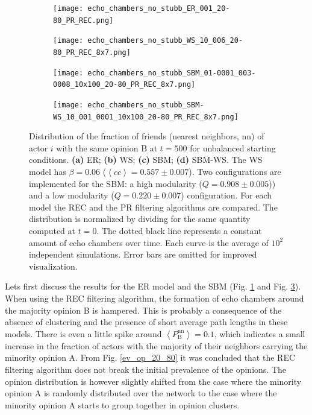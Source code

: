 \documentclass[11 pt , letterpaper , twoside , openright]{book}
\begin{document}
\begin{figure}[H]
  \begin{subfigure}[b]{0.49\textwidth}
    \caption{}
  	\texttt{[image: echo\_chambers\_no\_stubb\_ER\_001\_20-80\_PR\_REC.png]}
    \label{er_echo_20-80}
  \end{subfigure}
  \begin{subfigure}[b]{0.49\textwidth}
    \caption{}
  	\texttt{[image: echo\_chambers\_no\_stubb\_WS\_10\_006\_20-80\_PR\_REC\_8x7.png]}
    \label{ws}
  \end{subfigure}
  \begin{subfigure}[b]{0.49\textwidth}
    \caption{}
    \texttt{[image: echo\_chambers\_no\_stubb\_SBM\_01-0001\_003-0008\_10x100\_20-80\_PR\_REC\_8x7.png]}
  	\label{sbm}    
  \end{subfigure}
  \begin{subfigure}[b]{0.49\textwidth}
    \caption{}
    \texttt{[image: echo\_chambers\_no\_stubb\_SBM-WS\_10\_001\_0001\_10x100\_20-80\_PR\_REC\_8x7.png]}
    \label{sbm-ws}
  \end{subfigure}
  \captionsetup{format=plain}
  \caption[Distribution of the fraction of friends (nearest neighbors, nn) of actor $i$ with the same opinion B at $t=500$, $\left<P_\text{B}^{\text{nn}}\right>$, for unbalanced starting conditions.]{Distribution of the fraction of friends (nearest neighbors, nn) of actor $i$ with the same opinion B at $t = 500$ for unbalanced starting conditions. \textbf{(a)} ER; \textbf{(b)} WS; \textbf{(c)} SBM; \textbf{(d)} SBM-WS. The WS model has $\beta = 0.06$ ($\left<cc\right> = 0.557 \pm 0.007$). Two configurations are implemented for the SBM: a high modularity ($Q = 0.908 \pm 0.005$)) and a low modularity ($Q = 0.220 \pm 0.007$) configuration. For each model the REC and the PR filtering algorithms are compared. The distribution is normalized by dividing for the same quantity computed at $t=0$. The dotted black line represents a constant amount of echo chambers over time. Each curve is the average of $10^2$ independent simulations. Error bars are omitted for improved visualization.}
\label{echo_20_80}
\end{figure}
\noindent
Lets first discuss the results for the ER model and the SBM (Fig. \ref{er_echo_20-80} and Fig. \ref{sbm}). When using the REC filtering algorithm, the formation of echo chambers around the majority opinion B is hampered. This is probably a consequence of the absence of clustering and the presence of short average path lengths in these models. There is even a little spike around $\left<P_\text{B}^{\text{nn}}\right> = 0.1$, which indicates a small increase in the fraction of actors with the majority of their neighbors carrying the minority opinion A. From Fig. \ref{ev_op_20_80} it was concluded that the REC filtering algorithm does not break the initial prevalence of the opinions. The opinion distribution is however slightly shifted from the case where the minority opinion A is randomly distributed over the network to the case where the minority opinion A starts to group together in opinion clusters. \\
\end{document}
